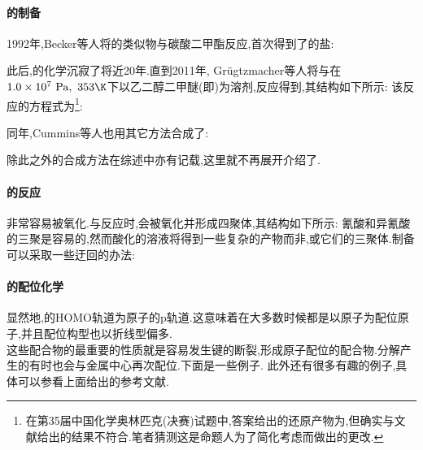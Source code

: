 \documentclass{ctexart}
\begin{document}
\paragraph{的制备}
1992年,Becker等人将的类似物与碳酸二甲酯反应,首次得到了的盐:
\begin{center}
\end{center}
此后,的化学沉寂了将近20年.直到2011年,
Grügtzmacher等人将与在$1.0\times10^7\text{ Pa},\ 353\K$下以乙二醇二甲醚(即)为溶剂,反应得到,其结构如下所示:
\noindent 该反应的方程式为\footnote{在第35届中国化学奥林匹克(决赛)试题中,答案给出的还原产物为,但确实与文献给出的结果不符合.笔者猜测这是命题人为了简化考虑而做出的更改.}:
\begin{center}
\end{center}
同年,Cummins等人也用其它方法合成了:
\begin{center}
\end{center}
除此之外的合成方法在综述中亦有记载,这里就不再展开介绍了.
\paragraph{的反应}
非常容易被氧化.与反应时,会被氧化并形成四聚体,其结构如下所示:
氰酸和异氰酸的三聚是容易的,然而酸化的溶液将得到一些复杂的产物而非,或它们的三聚体.制备可以采取一些迂回的办法:
\paragraph{的配位化学}
显然地,的HOMO轨道为原子的p轨道.这意味着在大多数时候都是以原子为配位原子,并且配位构型也以折线型偏多.\\
\indent 这些配合物的最重要的性质就是容易发生键的断裂,形成原子配位的配合物.分解产生的有时也会与金属中心再次配位.下面是一些例子.
此外还有很多有趣的例子,具体可以参看上面给出的参考文献.
\end{document}
